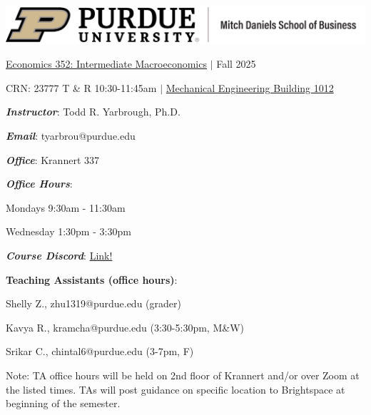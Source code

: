 \documentclass[11pt]{article}
\begin{document}
	
	\begin{center}
	\includegraphics[width=0.8\linewidth]{logo}
	
	\vspace{0.15in}
	
	{\Large \href{https://selfservice.mypurdue.purdue.edu/prod/bwckctlg.p_display_courses?term_in=202610&one_subj=ECON&sel_crse_strt=35200&sel_crse_end=35200&sel_subj=&sel_levl=&sel_schd=&sel_coll=&sel_divs=&sel_dept=&sel_attr=}{Economics 352: Intermediate Macroeconomics} $|$ Fall 2025 }
	
	\vspace{0.05in}
	
	CRN: 23777 T \& R 10:30-11:45am $|$ \href{https://duckduckgo.com/?q=mechanical+engeering+building+purdue&iaxm=maps}{Mechanical Engineering Building 1012}
			
		\end{center}
		
		\begin{minipage}{0.42\linewidth}
			
			\textit{\textbf{Instructor}}: Todd R. Yarbrough, Ph.D.
			
			\textit{\textbf{Email}}: tyarbrou@purdue.edu
			
			\textit{\textbf{Office}}: Krannert 337
			
			\textit{\textbf{Office Hours}}: 
			
			\hspace{0.15in} Mondays 9:30am - 11:30am
			
			\hspace{0.15in} Wednesday 1:30pm - 3:30pm
			
			\textbf{\textit{Course Discord}}: \href{https://discord.gg/jDFHMvC8SS}{Link!}
			
			\bigskip
			
			\bigskip
			
		\end{minipage}
		\hspace{0.0cm}
		\begin{minipage}{0.57\linewidth}
			
			\textbf{Teaching Assistants (office hours)}: 
			
			\hspace{0.05in} Shelly Z., zhu1319@purdue.edu (grader)
			
			\hspace{0.05in} Kavya R., kramcha@purdue.edu (3:30-5:30pm, M\&W)
			
			\hspace{0.05in} Srikar C., chintal6@purdue.edu (3-7pm, F)
			
			Note: TA office hours will be held on 2nd floor of Krannert and/or over Zoom at the listed times. TAs will post guidance on specific location to Brightspace at beginning of the semester. 
			
			\bigskip
			
		\end{minipage}
			
\end{document}
